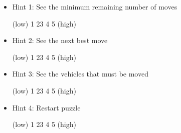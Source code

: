 \documentclass[doctor]{thesis} %
\theoremstyle{plain}
\begin{document}
\begin{enumerate}[topsep=-4em]
\begin{itemize}[topsep=-6em, label={o}]
\itemsep-1em 
\item Hint 1: See the minimum remaining number of moves
\par (low) \hspace{0.5cm}1 \hspace{1cm} 2\hspace{1cm}3\hspace{1cm} 4\hspace{1cm} 5 \hspace{0.5cm} (high)
\item Hint 2: See the next best move 
\par (low) \hspace{0.5cm}1 \hspace{1cm} 2\hspace{1cm}3\hspace{1cm} 4\hspace{1cm} 5 \hspace{0.5cm} (high)
\item Hint 3: See the vehicles that must be moved
\par (low) \hspace{0.5cm}1 \hspace{1cm} 2\hspace{1cm}3\hspace{1cm} 4\hspace{1cm} 5 \hspace{0.5cm} (high)
\item Hint 4: Restart puzzle
\par (low) \hspace{0.5cm}1 \hspace{1cm} 2\hspace{1cm}3\hspace{1cm} 4\hspace{1cm} 5 \hspace{0.5cm} (high)
\end{itemize}

\end{enumerate}
\newpage

\end{document}

